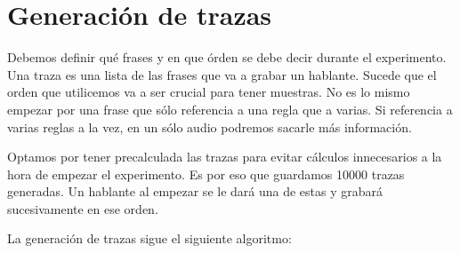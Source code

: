 \documentclass[11pt,a4paper,twoside]{tesis}
\begin{document}
\section{Generación de trazas}



Debemos definir qué frases y en que órden se debe decir durante el experimento. Una traza es una lista de las frases que va a grabar un hablante. Sucede que el orden que utilicemos va a ser crucial para tener muestras. No es lo mismo empezar por una frase que sólo referencia a una regla que a varias. Si referencia a varias reglas a la vez, en un sólo audio podremos sacarle más información.

Optamos por tener precalculada las trazas para evitar cálculos innecesarios a la hora de empezar el experimento. Es por eso que guardamos 10000 trazas generadas. Un hablante al empezar se le dará una de estas y grabará sucesivamente en ese orden.

La generación de trazas sigue el siguiente algoritmo:
\end{document}

